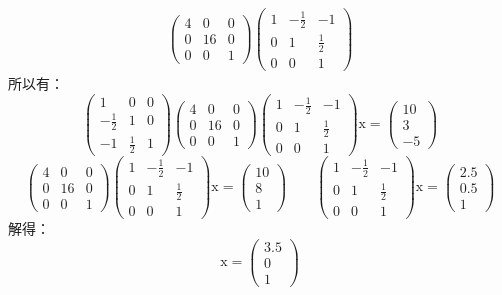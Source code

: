 \documentclass[12pt, onecolumn]{article}
\newcommand\bsm[1]{\boldsymbol{\mathrm{#1}}}
\begin{document}
{\begin{equation}
\begin{aligned}
\begin{pmatrix}
								4&0&0\\
								0&16&0\\
								0&0&1
						\end{pmatrix}
			\begin{pmatrix}
					1&-\frac{1}{2}&-1\\
					0&1&\frac{1}{2}\\
					0&0&1
					\end{pmatrix}
	\end{aligned}
	\end{equation}
	所以有：
	\begin{equation}
	\begin{pmatrix}
							1&0&0\\
							-\frac{1}{2}&1&0\\
							-1&\frac{1}{2}&1
							\end{pmatrix}\begin{pmatrix}
									4&0&0\\
									0&16&0\\
									0&0&1
							\end{pmatrix}
				\begin{pmatrix}
						1&-\frac{1}{2}&-1\\
						0&1&\frac{1}{2}\\
						0&0&1
						\end{pmatrix}\bsm{x}=\begin{pmatrix}
						10\\3\\-5
						\end{pmatrix}
	\end{equation}
	\begin{equation}
	\begin{pmatrix}
						4&0&0\\
						0&16&0\\
						0&0&1
				\end{pmatrix}
	\begin{pmatrix}
			1&-\frac{1}{2}&-1\\
			0&1&\frac{1}{2}\\
			0&0&1
			\end{pmatrix}\bsm{x}=\begin{pmatrix}
			10\\8\\1
			\end{pmatrix}
			\qquad
			\begin{pmatrix}
						1&-\frac{1}{2}&-1\\
						0&1&\frac{1}{2}\\
						0&0&1
						\end{pmatrix}\bsm{x}=\begin{pmatrix}
						2.5\\0.5\\1
						\end{pmatrix}
	\end{equation}
	解得：
	\begin{equation}
	\bsm{x}=\begin{pmatrix}
	3.5\\0\\1
	\end{pmatrix}
	\end{equation}
	}
	
\end{document}
